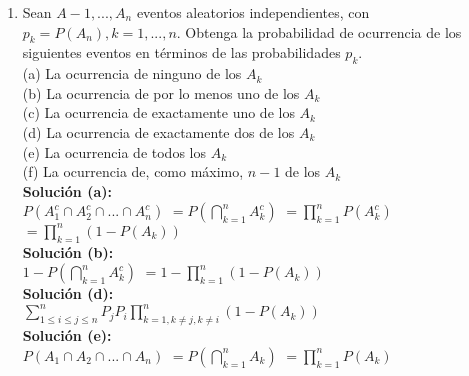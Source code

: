 \documentclass[12pt]{article}
\begin{document}
\begin{enumerate}
\item Sean $A-1,...,A_n$  eventos aleatorios independientes, con $p_k=P(A_n), k=1,...,n$. Obtenga la probabilidad de ocurrencia de los siguientes eventos en términos de las probabilidades $p_k$.\\
(a) La ocurrencia de ninguno de los $A_k$\\
 (b) La ocurrencia de por lo menos uno de los $A_k$\\
 (c) La ocurrencia de exactamente uno de los $A_k$\\
 (d) La ocurrencia de exactamente dos de los $A_k$\\
 (e) La ocurrencia de todos los $A_k$\\
 (f) La ocurrencia de, como máximo, $n-1$ de los $A_k$\\
 {\bf Solución (a):} \\
$P(A^c_1\cap A^c_2 \cap...\cap A^c_n)$
$=P\left(\displaystyle\bigcap_{k=1}^n{A^c_k} \right) $
$=\displaystyle\prod_{k=1}^{n}P\left(A^c_{k}\right)$\\
$=\displaystyle\prod_{k=1}^{n}(1-P\left(A_{k}\right))$\\ 
{\bf Solución (b):} \\
$1-P\left(\displaystyle\bigcap_{k=1}^n{A^c_k} \right) $
$=1-\displaystyle\prod_{k=1}^{n}(1-P\left(A_{k}\right))$\\


{\bf Solución (d):} \\
$\displaystyle\sum_{1\leq i \leq j \leq n}^{n}P_jP_i\displaystyle\prod_{k=1,k\neq j, k\neq i}^{n}(1-P\left(A_{k}\right)) $\\
{\bf Solución (e):} \\
$P(A_1\cap A_2 \cap...\cap A_n)$
$=P\left(\displaystyle\bigcap_{k=1}^n{A_k} \right) $
$=\displaystyle\prod_{k=1}^{n}P\left(A_{k}\right)$\\

\end{enumerate}
\end{document}
